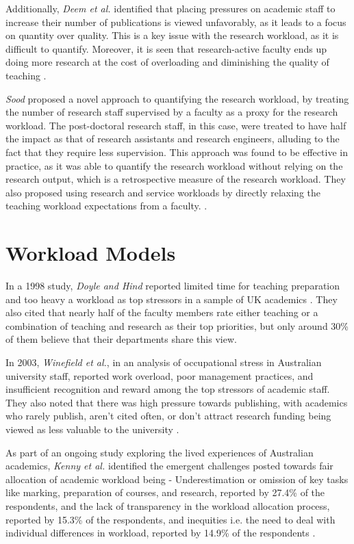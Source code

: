 Additionally, \textit{Deem et al.} identified that placing pressures on academic staff to increase their number of publications is viewed unfavorably, as it leads to a focus on quantity over quality. This is a key issue with the research workload, as it is difficult to quantify. Moreover, it is seen that research-active faculty ends up doing more research at the cost of overloading and diminishing the quality of teaching \cite{deem2020new}.

\textit{Sood} proposed a novel approach to quantifying the research workload, by treating the number of research staff supervised by a faculty as a proxy for the research workload. The post-doctoral research staff, in this case, were treated to have half the impact as that of research assistants and research engineers, alluding to the fact that they require less supervision. This approach was found to be effective in practice, as it was able to quantify the research workload without relying on the research output, which is a retrospective measure of the research workload. They also proposed using research and service workloads by directly relaxing the teaching workload expectations from a faculty. \cite{rohan2017}.

\section{Workload Models}

In a 1998 study, \textit{Doyle and Hind} reported limited time for teaching preparation and too heavy a workload as top stressors in a sample of UK academics \cite{doyle1998occupational}. They also cited that nearly half of the faculty members rate either teaching or a combination of teaching and research as their top priorities, but only around 30\% of them believe that their departments share this view.

In 2003, \textit{Winefield et al.}, in an analysis of occupational stress in Australian university staff, reported work overload, poor management practices, and insufficient recognition and reward among the top stressors of academic staff. They also noted that there was high pressure towards publishing, with academics who rarely publish, aren't cited often, or don't attract research funding being viewed as less valuable to the university \cite{winefield2003occupational}.

As part of an ongoing study exploring the lived experiences of Australian academics, \textit{Kenny et al.} identified the emergent challenges posted towards fair allocation of academic workload being - Underestimation or omission of key tasks like marking, preparation of courses, and research, reported by 27.4\% of the respondents, and the lack of transparency in the workload allocation process, reported by 15.3\% of the respondents, and inequities i.e. the need to deal with individual differences in workload, reported by 14.9\% of the respondents \cite{kenny2021emerging}.

